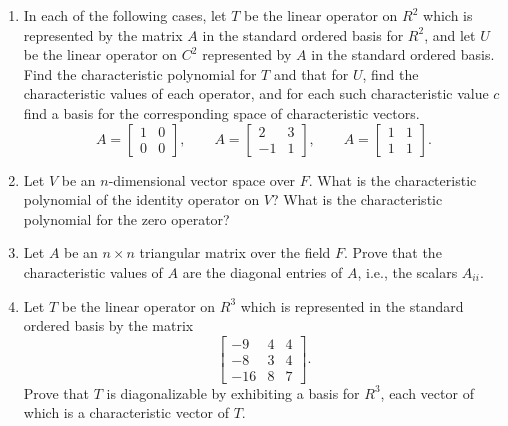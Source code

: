 \begin{enumerate}
    \item In each of the following cases, let \(T\) be the linear operator on \(R^2\) which is represented by the matrix \(A\) in the standard ordered basis for \(R^2\), and let \(U\) be the linear operator on \(C^2\) represented by \(A\) in the standard ordered basis. Find the characteristic polynomial for \(T\) and that for \(U\), find the characteristic values of each operator, and for each such characteristic value \(c\) find a basis for the corresponding space of characteristic vectors.
        \begin{equation*}
            A=
            \begin{bmatrix}
                1 & 0 \\
                0 & 0
            \end{bmatrix}
            ,\qquad A=
            \begin{bmatrix}
                2 & 3 \\
                -1 & 1
            \end{bmatrix}
            ,\qquad A=
            \begin{bmatrix}
                1 & 1 \\
                1 & 1
            \end{bmatrix}
            .
        \end{equation*}
    \item Let \(V\) be an \(n\)-dimensional vector space over \(F\). What is the characteristic polynomial of the identity operator on \(V\)? What is the characteristic polynomial for the zero operator?
    \item Let \(A\) be an \(n\times n\) triangular matrix over the field \(F\). Prove that the characteristic values of \(A\) are the diagonal entries of \(A\), i.e., the scalars \(A_{ii}\).
    \item Let \(T\) be the linear operator on \(R^3\) which is represented in the standard ordered basis by the matrix
        \begin{equation*}
            \begin{bmatrix}
                -9 & 4 & 4 \\
                -8 & 3 & 4 \\
                -16 & 8 & 7
            \end{bmatrix}
            .
        \end{equation*}
        Prove that \(T\) is diagonalizable by exhibiting a basis for \(R^3\), each vector of which is a characteristic vector of \(T\).

\end{enumerate}
